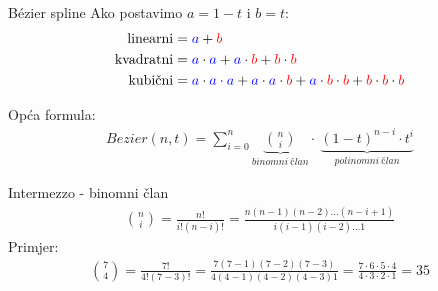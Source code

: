 \documentclass[9pt]{beamer}
\begin{document}
\begin{frame}{B\'{e}zier spline}
	Ako postavimo $a = 1-t$ i $b = t:$
		\begin{align*}
		\mathrm{linearni} &= {\color{blue}a} + {\color{red}b} \\
		\mathrm{kvadratni} &= {\color{blue}a} \cdot {\color{blue}a} + {\color{blue}a} \cdot {\color{red}b} + {\color{red}b} \cdot {\color{red}b} \\
		\textrm{kubični} &= {\color{blue}a} \cdot {\color{blue}a} \cdot {\color{blue}a} + {\color{blue}a} \cdot {\color{blue}a} \cdot {\color{red}b} + {\color{blue}a} \cdot {\color{red}b} \cdot {\color{red}b} + {\color{red}b} \cdot {\color{red}b} \cdot {\color{red}b}\\
		\end{align*}

		Opća formula:
		\begin{align*}
		Bezier(n,t) = \sum_{i=0}^{n}
		\underset{binomni\ član}{\underbrace{\binom{n}{i}}}
		\cdot\
		\underset{polinomni\ član}{\underbrace{(1-t)^{n-i} \cdot t^{i}}}
		\end{align*}
	
\end{frame}
\begin{frame}{Intermezzo - binomni član}
	\begin{align*}
	\binom{n}{i} = \frac{n!}{i!(n-i)!} = \frac{n(n-1)(n-2)\ldots (n-i+1)}{i(i-1)(i-2)\ldots 1}
	\end{align*}
	Primjer:
	\begin{align*}
	\binom{7}{4} = \frac{7!}{4!(7-3)!} = \frac{7(7-1)(7-2)(7-3)}{4(4-1)(4-2)(4-3)1} 
	= \frac{7\cdot 6\cdot 5\cdot 4}{4\cdot 3\cdot 2\cdot 1} = 35
	\end{align*}
\end{frame}
\end{document}
